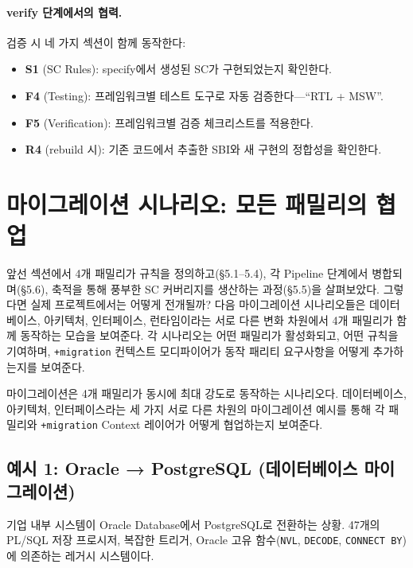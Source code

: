 \documentclass[11pt,a4paper,openright,twoside]{report}
\begin{document}
\paragraph{verify 단계에서의 협력.}
검증 시 네 가지 섹션이 함께 동작한다:
\begin{itemize}
  \item \textbf{S1} (SC Rules): specify에서 생성된 SC가 구현되었는지 확인한다.
  \item \textbf{F4} (Testing): 프레임워크별 테스트 도구로 자동 검증한다---``RTL + MSW''.
  \item \textbf{F5} (Verification): 프레임워크별 검증 체크리스트를 적용한다.
  \item \textbf{R4} (rebuild 시): 기존 코드에서 추출한 SBI와 새 구현의 정합성을 확인한다.
\end{itemize}


\section{마이그레이션 시나리오: 모든 패밀리의 협업}
\label{sec:migration-scenario}

앞선 섹션에서 4개 패밀리가 규칙을 정의하고(\S5.1--5.4), 각 Pipeline 단계에서 병합되며(\S5.6), 축적을 통해 풍부한 SC 커버리지를 생산하는 과정(\S5.5)을 살펴보았다. 그렇다면 실제 프로젝트에서는 어떻게 전개될까? 다음 마이그레이션 시나리오들은 데이터베이스, 아키텍처, 인터페이스, 런타임이라는 서로 다른 변화 차원에서 4개 패밀리가 함께 동작하는 모습을 보여준다. 각 시나리오는 어떤 패밀리가 활성화되고, 어떤 규칙을 기여하며, \texttt{+migration} 컨텍스트 모디파이어가 동작 패리티 요구사항을 어떻게 추가하는지를 보여준다.

마이그레이션은 4개 패밀리가 동시에 최대 강도로 동작하는 시나리오다. 데이터베이스, 아키텍처, 인터페이스라는 세 가지 서로 다른 차원의 마이그레이션 예시를 통해 각 패밀리와 \texttt{+migration} Context 레이어가 어떻게 협업하는지 보여준다.

\subsection{예시 1: Oracle → PostgreSQL (데이터베이스 마이그레이션)}

기업 내부 시스템이 Oracle Database에서 PostgreSQL로 전환하는 상황. 47개의 PL/SQL 저장 프로시저, 복잡한 트리거, Oracle 고유 함수(\texttt{NVL}, \texttt{DECODE}, \texttt{CONNECT BY})에 의존하는 레거시 시스템이다.
\end{document}
